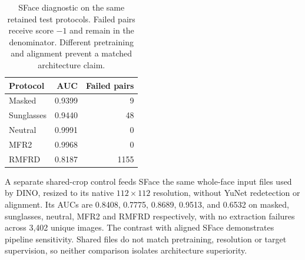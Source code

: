 \documentclass[12pt,a4paper,oneside]{report}
\begin{document}
\begin{table}[t]
\centering
\caption{SFace diagnostic on the same retained test protocols. Failed pairs receive score $-1$ and remain in the denominator. Different pretraining and alignment prevent a matched architecture claim.}
\label{tab:sface}
\begin{tabular}{lrr}
\toprule
Protocol & AUC & Failed pairs\\
\midrule
Masked & 0.9399 & 9\\
Sunglasses & 0.9440 & 48\\
Neutral & 0.9991 & 0\\
MFR2 & 0.9968 & 0\\
RMFRD & 0.8187 & 1155\\
\bottomrule
\end{tabular}
\end{table}
A separate shared-crop control feeds SFace the same whole-face input files used by DINO, resized to its native $112\!\times\!112$ resolution, without YuNet redetection or alignment. Its AUCs are 0.8408, 0.7775, 0.8689, 0.9513, and 0.6532 on masked, sunglasses, neutral, MFR2 and RMFRD respectively, with no extraction failures across 3,402 unique images. The contrast with aligned SFace demonstrates pipeline sensitivity. Shared files do not match pretraining, resolution or target supervision, so neither comparison isolates architecture superiority.
\end{document}
